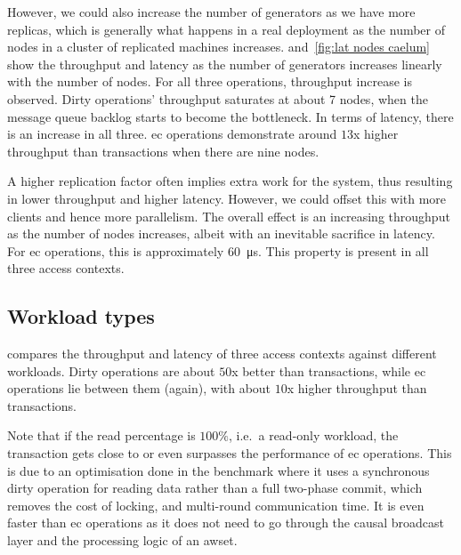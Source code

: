 However, we could also increase the number of generators as we have more replicas,
which is generally what happens in a real deployment as the number of nodes in a cluster 
of replicated machines increases.
 and~\cref{fig:lat nodes caelum} show the throughput and 
latency as the number of generators increases linearly with the number of nodes.
For all three operations, throughput increase is observed. Dirty operations' throughput
saturates at about 7 nodes, when the message queue backlog starts to become the
bottleneck. In terms of latency, there is an increase in all three. \acrshort{ec} 
operations demonstrate around \(13\)x higher throughput than transactions when 
there are nine nodes.

A higher replication factor often implies extra work for the system, thus resulting
in lower throughput and higher latency. However, we could offset this with more
clients and hence more parallelism. The overall effect is an increasing
throughput as the number of nodes increases, albeit with an inevitable sacrifice 
in latency. For \acrshort{ec} operations, this is approximately \qty{60}{\micro\second}.
This property is present in all three access contexts.


\subsection{Workload types} \label{subsec:eval workload types}

 compares the throughput and latency of three access
contexts against different workloads. Dirty operations are about
\(50\)x better than transactions, while \acrshort{ec} operations lie between 
them (again), with about \(10\)x higher throughput than transactions.

Note that if the read percentage is \(100\%\), i.e.\ a read-only workload, the
transaction gets close to or even surpasses the performance of \acrshort{ec}
operations. This is due to an optimisation done in the benchmark where it
uses a synchronous dirty operation for reading data rather than a full
two-phase commit, which removes the cost of locking, and multi-round communication
time. It is even faster than \acrshort{ec} operations as it does not need to
go through the causal broadcast layer and the processing logic of an \acrshort{awset}.

